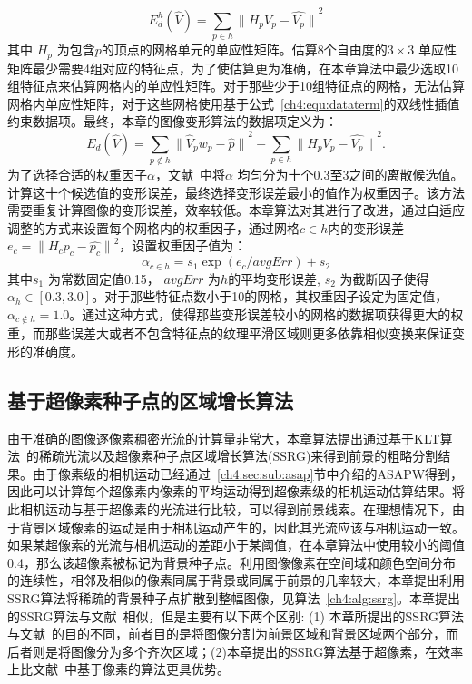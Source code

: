  $$E^{h}_{d}(\hat{V}) = \sum_{p\in h}{\parallel H_{p}V_{p} - \hat{V_{p}}\parallel}^2$$
其中 $H_{p}$ 为包含$p$的顶点的网格单元的单应性矩阵。估算8个自由度的$3\times3$ 单应性矩阵最少需要4组对应的特征点，为了使估算更为准确，在本章算法中最少选取10组特征点来估算网格内的单应性矩阵。对于那些少于10组特征点的网格，无法估算网格内单应性矩阵，对于这些网格使用基于公式~\ref{ch4:equ:dataterm}的双线性插值约束数据项。最终，本章的图像变形算法的数据项定义为：
$${E}_{d}(\hat{V}) = \sum_{p \notin h}{\parallel\hat{V}_{p}{w}_{p}- \hat{p}\parallel}^{2} +
\sum_{p\in h}{\parallel {H_{p}V_{p} - \hat{V_{p}}}\parallel}^2.$$
为了选择合适的权重因子$\alpha$，文献~中将$\alpha$ 均匀分为十个0.3至3之间的离散候选值。计算这十个候选值的变形误差，最终选择变形误差最小的值作为权重因子。该方法需要重复计算图像的变形误差，效率较低。本章算法对其进行了改进，通过自适应调整的方式来设置每个网格内的权重因子，通过网格$c \in h$内的变形误差$e_{c} = {\parallel H_{c}p_{c} - \hat{p_{c}} \parallel}^2 $，设置权重因子值为：
 $$ \alpha_{c\in h} = s_{1}\exp({e_{c}/avgErr})+ s_{2} $$
 其中$s_{1}$ 为常数固定值0.15， $avgErr$ 为$h$的平均变形误差, $s_{2}$ 为截断因子使得 $\alpha_{h} \in [0.3,3.0]$。对于那些特征点数小于10的网格，其权重因子设定为固定值， $\alpha_{c \notin h} = 1.0$。通过这种方式，使得那些变形误差较小的网格的数据项获得更大的权重，而那些误差大或者不包含特征点的纹理平滑区域则更多依靠相似变换来保证变形的准确度。
\subsection{基于超像素种子点的区域增长算法}
\label{ch4:sec:sub:ssrg}
由于准确的图像逐像素稠密光流的计算量非常大，本章算法提出通过基于KLT算法~\cite{KLT}的稀疏光流以及超像素种子点区域增长算法(SSRG)来得到前景的粗略分割结果。由于像素级的相机运动已经通过~\ref{ch4:sec:sub:asap}节中介绍的ASAPW得到，因此可以计算每个超像素内像素的平均运动得到超像素级的相机运动估算结果。将此相机运动与基于超像素的光流进行比较，可以得到前景线索。在理想情况下，由于背景区域像素的运动是由于相机运动产生的，因此其光流应该与相机运动一致。如果某超像素的光流与相机运动的差距小于某阈值，在本章算法中使用较小的阈值0.4，那么该超像素被标记为背景种子点。利用图像像素在空间域和颜色空间分布的连续性，相邻及相似的像素同属于背景或同属于前景的几率较大，本章提出利用SSRG算法将稀疏的背景种子点扩散到整幅图像，见算法~\ref{ch4:alg:ssrg}。本章提出的SSRG算法与文献~相似，但是主要有以下两个区别: (1) 本章所提出的SSRG算法与文献~的目的不同，前者目的是将图像分割为前景区域和背景区域两个部分，而后者则是将图像分为多个齐次区域；(2)本章提出的SSRG算法基于超像素，在效率上比文献~中基于像素的算法更具优势。

